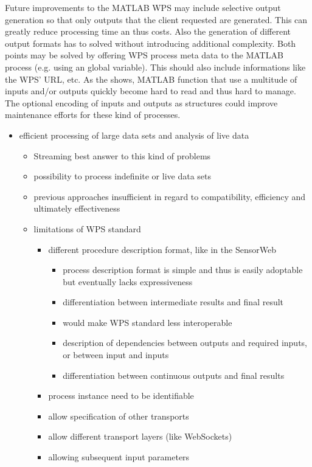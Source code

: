   Future improvements to the MATLAB WPS may include selective output generation so that only outputs that the client requested are generated. This can greatly reduce processing time an thus costs. Also the generation of different output formats has to solved without introducing additional complexity. Both points may be solved by offering WPS process meta data to the MATLAB process (e.g. using an global variable). This should also include informations like the WPS' URL, etc. As the \la shows, MATLAB function that use a multitude of inputs and/or outputs quickly become hard to read and thus hard to manage. The optional encoding of inputs and outputs as structures could improve maintenance efforts for these kind of processes.
  \begin{itemize}
    \item efficient processing of large data sets and analysis of live data
    \begin{itemize}
      \item Streaming best answer to this kind of problems
      \item possibility to process indefinite or live data sets
      \item previous approaches insufficient in regard to compatibility, efficiency and ultimately effectiveness
      \item limitations of WPS standard
      \begin{itemize}
        \item different procedure description format, like in the SensorWeb
        \begin{itemize}
          \item process description format is simple and thus is easily adoptable but eventually lacks expressiveness
          \item differentiation between intermediate results and final result
          \item would make WPS standard less interoperable
          \item description of dependencies between outputs and required inputs, or between input and inputs
          \item differentiation between continuous outputs and final results
        \end{itemize}
        \item process instance need to be identifiable
        \item allow specification of other transports
        \item allow different transport layers (like WebSockets)
        \item allowing subsequent input parameters
      \end{itemize}


\end{itemize}
\end{itemize}
